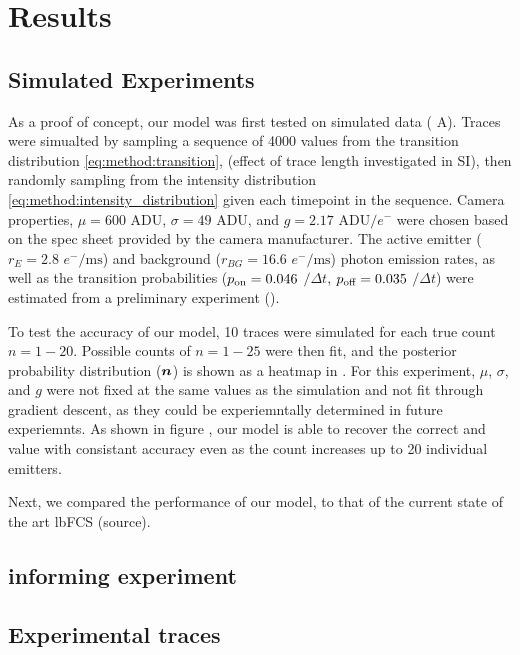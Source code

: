 \section{Results}

\subsection{Simulated Experiments}

As a proof of concept, our model was first tested on simulated data ( A). 
	Traces were simualted by sampling a sequence of 4000 \states values from 
	the transition distribution \eqref{eq:method:transition}, 
	(effect of trace length investigated in SI),
	then randomly sampling from the intensity distribution \eqref{eq:method:intensity_distribution} given each timepoint in the \states sequence.
%
	Camera properties, $\mu=600$ ADU, $\sigma=49$ ADU, and $g=2.17$ ADU$/e^{-}$ were chosen based on the spec sheet provided by the camera manufacturer.
%
	The active emitter ($r_{E}=2.8$ $e^{-}/\text{ms}$) and background ($r_{BG}=16.6$ $e^{-}/\text{ms}$) photon emission rates, 
	as well as the transition probabilities ($p_\text{on}=0.046$ $/\Delta t$, $p_\text{off}=0.035$ $/\Delta t$)
	were estimated from a preliminary experiment ().

To test the accuracy of our model, 10 traces were simulated for each true count $n=1-20$. 
	Possible counts of $n=1-25$ were then fit,
	and the posterior probability distribution ($\bm{n}$) is shown as a heatmap in . 
%
	For this experiment, $\mu$, $\sigma$, and $g$ were not fixed at the same values as the simulation and not fit through gradient descent, 
	as they could be experiemntally determined in future experiemnts.
%
	As shown in figure , our model is able to recover the correct \pon and \poff value with consistant accuracy even as the count
	increases up to 20 individual emitters.

Next, we compared the performance of our model, to that of the current state of the art lbFCS (source).
%

\subsection{informing experiment}


\subsection{Experimental traces}




